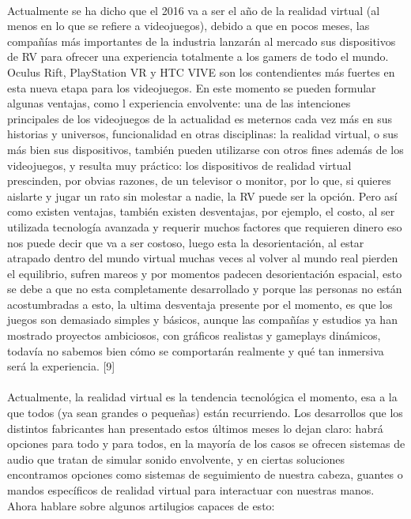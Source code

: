 \documentclass{bmcart}
\begin{document}
\paragraph{}
Actualmente se ha dicho que el 2016 va a ser el año de la realidad virtual (al menos en lo que se refiere a videojuegos), debido a que en pocos meses, las compañías más importantes de la industria lanzarán al mercado sus dispositivos de RV para ofrecer una experiencia totalmente a los gamers de todo el mundo. Oculus Rift, PlayStation VR y HTC VIVE son los contendientes más fuertes en esta nueva etapa para los videojuegos. En este momento se pueden formular algunas ventajas, como l experiencia envolvente: una de las intenciones principales de los videojuegos de la actualidad es meternos cada vez más en sus historias y universos, funcionalidad en otras disciplinas: la realidad virtual, o sus más bien sus dispositivos, también pueden utilizarse con otros fines además de los videojuegos, y resulta muy práctico: los dispositivos de realidad virtual prescinden, por obvias razones, de un televisor o monitor, por lo que, si quieres aislarte y jugar un rato sin molestar a nadie, la RV puede ser la opción. Pero así como existen ventajas, también existen desventajas, por ejemplo, el costo, al ser utilizada tecnología avanzada y requerir muchos factores que requieren dinero eso nos puede decir que va a ser costoso, luego esta la desorientación, al estar atrapado dentro del mundo virtual muchas veces al volver al mundo real pierden el equilibrio, sufren mareos y por momentos padecen desorientación espacial, esto se debe a que no esta completamente desarrollado y porque las personas no están acostumbradas a esto, la ultima desventaja presente por el momento, es que los juegos son demasiado simples y básicos, aunque las compañías y estudios ya han mostrado proyectos ambiciosos, con gráficos realistas y gameplays dinámicos, todavía no sabemos bien cómo se comportarán realmente y qué tan inmersiva será la experiencia. [9]
\paragraph{}
Actualmente, la realidad virtual es la tendencia tecnológica el momento, esa a la que todos (ya sean grandes o pequeñas) están recurriendo. Los desarrollos que los distintos fabricantes han presentado estos últimos meses lo dejan claro: habrá opciones para todo y para todos, en la mayoría de los casos se ofrecen sistemas de audio que tratan de simular sonido envolvente, y en ciertas soluciones encontramos opciones como sistemas de seguimiento de nuestra cabeza, guantes o mandos específicos de realidad virtual para interactuar con nuestras manos.
Ahora hablare sobre algunos artilugios capaces de esto: 
\end{document}
